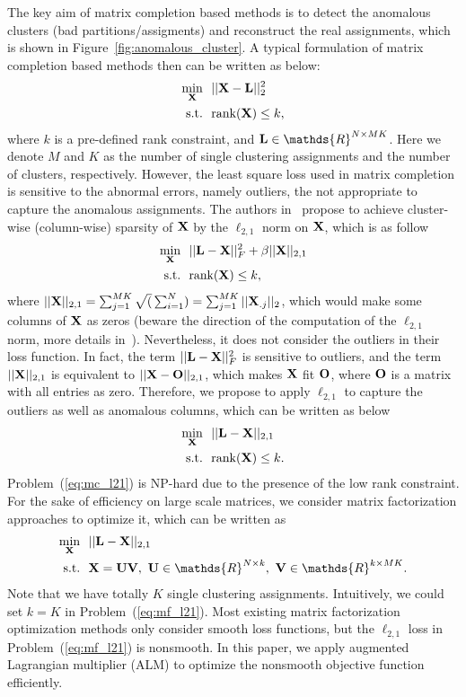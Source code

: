 \documentclass[letterpaper]{article}
\def\bL{{\bf L}}
\def\bO{{\bf O}}
\def\bU{{\bf U}}
\def\bV{{\bf V}}
\def\dsR{\mathds{R}}
\def\bX{{\bf X}}
\def\bX{{\bf X}}
\def\st{{\text{s.t.}}}
\def\rank{{\text{rank}}}
\begin{document}
The key aim of matrix completion based methods is to detect the anomalous clusters (bad partitions/assigments) and reconstruct the real assignments,
which is shown in Figure~\ref{fig:anomalous_cluster}.
A typical formulation of matrix completion based methods then can be written as below:
\begin{align}\label{eq:typical_mc}
  \min_{\bX} ~&~ || \bX - \bL ||_2^2   \nonumber \\
  \st        ~&~ \rank(\bX) \leq k  ,
\end{align}
\noindent
where $k$ is a pre-defined rank constraint,
and $\bL \in \dsR^{N \times MK}$.
Here we denote $M$ and $K$ as the number of single clustering assignments and the number of clusters, respectively.
However, the least square loss used in matrix completion is sensitive to the abnormal errors, namely outliers, the not appropriate to capture the anomalous assignments.
The authors in~\cite{gaoijcai2016robust} propose to achieve cluster-wise (column-wise) sparsity of $\bX$ by the $\ell_{2,1}$ norm on $\bX$, which is as follow
\begin{align}\label{eq:mc_l21_gaospaper}
  \min_{\bX} ~&~ || \bL - \bX ||_F^2 + \beta || \bX ||_{2,1}   \nonumber \\
  \st        ~&~ \rank(\bX) \leq k   ,
\end{align}
\noindent
where $|| \bX ||_{2,1} = \sum_{j = 1}^{MK} \sqrt(\sum_{i=1}^{N}) = \sum_{j=1}^{MK} || \bX_{.j} ||_2$,
which would make some columns of $\bX$ as zeros (beware the direction of the computation of the $\ell_{2,1}$ norm, more details in~\cite{nienips2010efficient}).
Nevertheless, it does not consider the outliers in their loss function.
In fact, the term $|| \bL - \bX ||_F^2$ is sensitive to outliers, and the term $|| \bX ||_{2,1}$ is equivalent to $|| \bX - \bO ||_{2,1}$, which makes $\bX$ fit $\bO$, where $\bO$ is a matrix with all entries as zero.
Therefore, we propose to apply $\ell_{2,1}$ to capture the outliers as well as anomalous columns, which can be written as below
\begin{align}\label{eq:mc_l21}
  \min_{\bX} ~&~ || \bL - \bX ||_{2,1}    \nonumber \\
  \st        ~&~ \rank(\bX) \leq k  .
\end{align}
Problem~(\ref{eq:mc_l21}) is NP-hard due to the presence of the low rank constraint.
For the sake of efficiency on large scale matrices, we consider matrix factorization approaches to optimize it, which can be written as
\begin{align}\label{eq:mf_l21}
  \min_{\bX} ~&~ || \bL - \bX ||_{2,1}    \nonumber \\
  \st        ~&~ \bX = \bU \bV,~\bU \in \dsR^{N \times k},~\bV \in \dsR^{k \times MK} .
\end{align}
\noindent
Note that we have totally $K$ single clustering assignments.
Intuitively, we could set $k = K$ in Problem~(\ref{eq:mf_l21}).
Most existing matrix factorization optimization methods only consider smooth loss functions,
but the $\ell_{2,1}$ loss in Problem~(\ref{eq:mf_l21}) is nonsmooth.
In this paper, we apply augmented Lagrangian multiplier (ALM) to optimize the nonsmooth objective function efficiently.
\end{document}
